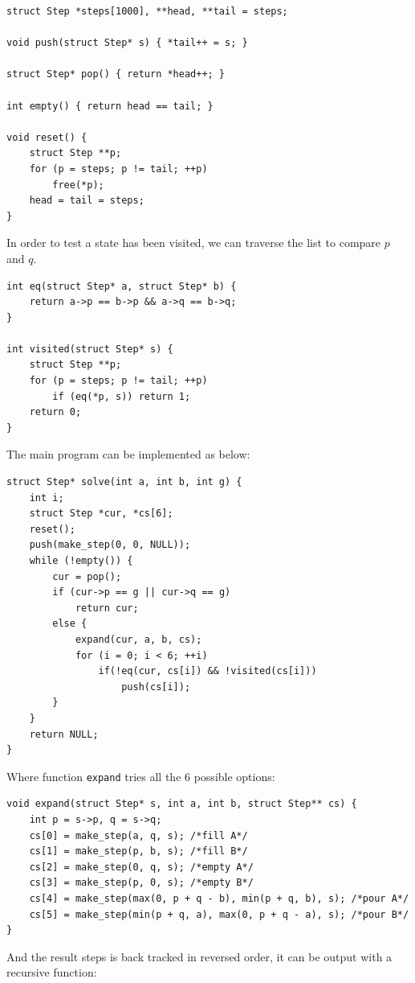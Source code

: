\documentclass[UTF8]{article}
\begin{document}
\lstset{language=C}
\begin{lstlisting}
struct Step *steps[1000], **head, **tail = steps;

void push(struct Step* s) { *tail++ = s; }

struct Step* pop() { return *head++; }

int empty() { return head == tail; }

void reset() {
    struct Step **p;
    for (p = steps; p != tail; ++p)
        free(*p);
    head = tail = steps;
}
\end{lstlisting}

In order to test a state has been visited, we can traverse the list to compare $p$ and $q$.

\lstset{language=C}
\begin{lstlisting}
int eq(struct Step* a, struct Step* b) {
    return a->p == b->p && a->q == b->q;
}

int visited(struct Step* s) {
    struct Step **p;
    for (p = steps; p != tail; ++p)
        if (eq(*p, s)) return 1;
    return 0;
}
\end{lstlisting}

The main program can be implemented as below:

\lstset{language=C}
\begin{lstlisting}
struct Step* solve(int a, int b, int g) {
    int i;
    struct Step *cur, *cs[6];
    reset();
    push(make_step(0, 0, NULL));
    while (!empty()) {
        cur = pop();
        if (cur->p == g || cur->q == g)
            return cur;
        else {
            expand(cur, a, b, cs);
            for (i = 0; i < 6; ++i)
                if(!eq(cur, cs[i]) && !visited(cs[i]))
                    push(cs[i]);
        }
    }
    return NULL;
}
\end{lstlisting}

Where function \texttt{expand} tries all the 6 possible options:

\lstset{language=C}
\begin{lstlisting}
void expand(struct Step* s, int a, int b, struct Step** cs) {
    int p = s->p, q = s->q;
    cs[0] = make_step(a, q, s); /*fill A*/
    cs[1] = make_step(p, b, s); /*fill B*/
    cs[2] = make_step(0, q, s); /*empty A*/
    cs[3] = make_step(p, 0, s); /*empty B*/
    cs[4] = make_step(max(0, p + q - b), min(p + q, b), s); /*pour A*/
    cs[5] = make_step(min(p + q, a), max(0, p + q - a), s); /*pour B*/
}
\end{lstlisting}

And the result steps is back tracked in reversed order, it can be output
with a recursive function:
\end{document}
